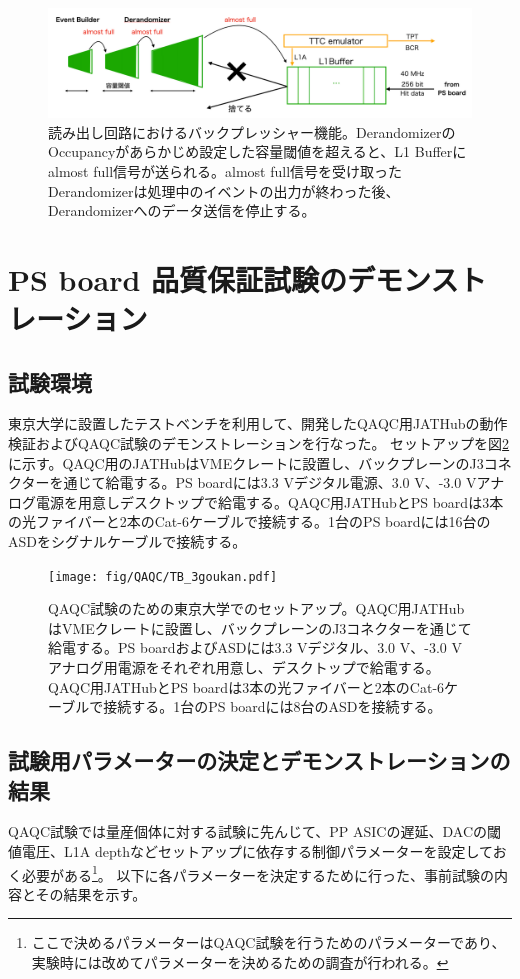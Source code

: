 \begin{figure} 
\centering
\includegraphics[width=16cm]{fig/QAQC/JATHubbackpressure.png}
\caption[リードアウト回路におけるバックプレッシャー機能]{読み出し回路におけるバックプレッシャー機能。DerandomizerのOccupancyがあらかじめ設定した容量閾値を超えると、L1 Bufferにalmost full信号が送られる。almost full信号を受け取ったDerandomizerは処理中のイベントの出力が終わった後、Derandomizerへのデータ送信を停止する。}
\label{JATHubbackpressure}
\end{figure}


\clearpage
\section{PS board 品質保証試験のデモンストレーション}
\label{sec_PSboardQAQCdemo}

\subsection{試験環境}
\label{subsec_testenv}
東京大学に設置したテストベンチを利用して、開発したQAQC用JATHubの動作検証およびQAQC試験のデモンストレーションを行なった。
セットアップを図\ref{QAQCsetup}に示す。QAQC用のJATHubはVMEクレートに設置し、バックプレーンのJ3コネクターを通じて給電する。PS boardには3.3 Vデジタル電源、3.0 V、-3.0 Vアナログ電源を用意しデスクトップで給電する。QAQC用JATHubとPS boardは3本の光ファイバーと2本のCat-6ケーブルで接続する。1台のPS boardには16台のASDをシグナルケーブルで接続する。

\begin{figure} 
\centering
\texttt{[image: fig/QAQC/TB\_3goukan.pdf]}
\caption[]{QAQC試験のための東京大学でのセットアップ。QAQC用JATHubはVMEクレートに設置し、バックプレーンのJ3コネクターを通じて給電する。PS boardおよびASDには3.3 Vデジタル、3.0 V、-3.0 Vアナログ用電源をそれぞれ用意し、デスクトップで給電する。QAQC用JATHubとPS boardは3本の光ファイバーと2本のCat-6ケーブルで接続する。1台のPS boardには8台のASDを接続する。}
\label{QAQCsetup}
\end{figure}


\subsection{試験用パラメーターの決定とデモンストレーションの結果}
\label{subsec_tb_result}
QAQC試験では量産個体に対する試験に先んじて、PP ASICの遅延、DACの閾値電圧、L1A depthなどセットアップに依存する制御パラメーターを設定しておく必要がある\footnote{ここで決めるパラメーターはQAQC試験を行うためのパラメーターであり、実験時には改めてパラメーターを決めるための調査が行われる。}。
以下に各パラメーターを決定するために行った、事前試験の内容とその結果を示す。

